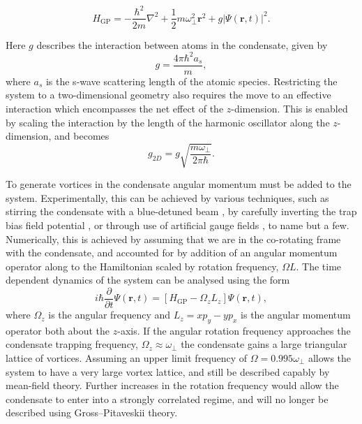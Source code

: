 \begin{equation}\label{eqn:gpe_h0}
	H_{\mathrm{GP}} = -\frac{\hbar^2}{2m}\nabla^2 + \frac{1}{2}m\omega_{\perp}^2\mathbf{r}^2 + g\vert\Psi(\mathbf{r},t)\vert^2.
\end{equation}

Here $g$ describes the interaction between atoms in the condensate, given by \begin{equation}
g = \frac{4\pi\hbar^2a_s}{m},
\end{equation}
where $a_s$ is the s-wave scattering length of the atomic species. Restricting the system to a two-dimensional geometry also requires the move to an effective interaction which encompasses the net effect of the $z$-dimension. This is enabled by scaling the interaction by the length of the harmonic oscillator along the $z$-dimension, and becomes
\begin{equation}
g_{2D} = g\sqrt{\frac{m\omega_\perp}{2\pi\hbar}}.
\end{equation}

To generate vortices in the condensate angular momentum must be added to the system. Experimentally, this can be achieved by various techniques, such as stirring the condensate with a blue-detuned beam \cite{Vtx:Raman_prl_2001}, by carefully inverting the trap bias field potential \cite{Vtx:Kawaguchi_pra_2004}, or through use of artificial gauge fields \cite{AO:Dalibard_rmp_2011}, to name but a few. Numerically, this is achieved by assuming that we are in the co-rotating frame with the condensate, and accounted for by addition of an angular momentum operator along to the Hamiltonian scaled by rotation frequency, $\Omega L$. The time dependent dynamics of the system can be analysed using the form
\begin{equation}\label{eqn:gpe}
	i\hbar\frac{\partial}{\partial t}\Psi(\mathbf{r},t) = \left[ H_{\text{GP}}  -  \Omega_z L_z \right] \Psi(\mathbf{r},t),
\end{equation}
where $\Omega_z$ is the angular frequency and $L_z = xp_y - yp_x$ is the angular momentum operator both about the $z$-axis. If the angular rotation frequency approaches the condensate trapping frequency, $\Omega_z \approx \omega_\perp$ the condensate gains a large triangular lattice of vortices. Assuming an upper limit frequency of $\Omega = 0.995\omega_\perp$ allows the system to have a very large vortex lattice, and still be described capably by mean-field theory. Further increases in the rotation frequency would allow the condensate to enter into a strongly correlated regime, and will no longer be described using Gross--Pitaveskii theory.

